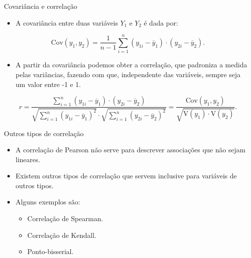 \documentclass[
  ignorenonframetext,
  serif,
  professionalfont,
  usenames,
  dvipsnames,
  aspectratio = 169]{beamer}
\providecommand{\tightlist}{%
  \setlength{\itemsep}{0pt}\setlength{\parskip}{0pt}}
\renewcommand{\tightlist}{%
  \setlength{\itemsep}{0\baselineskip}
  \setlength{\parskip}{0.25\baselineskip}
}
\def\beginAHalfColumn{\begin{minipage}{0.49\textwidth}}%
\def\endColumns{\end{minipage}}%
\begin{document}
\begin{frame}{Covariância e correlação}
\label{covariuxe2ncia-e-correlauxe7uxe3o}
\begin{itemize}
\tightlist
\item
  A covariância entre duas variáveis \(Y_1\) e \(Y_2\) é dada por:
\end{itemize}

\[
\textrm{Cov}(y_1, y_2) = \frac{1}{n - 1}
         \displaystyle\sum_{i = 1}^{n}
         (y_{1i} - \overline{y}_1)\cdot
         (y_{2i} - \overline{y}_2).
\]

\begin{itemize}
\tightlist
\item
  A partir da covariância podemos obter a correlação, que padroniza a
  medida pelas variâncias, fazendo com que, independente das variáveis,
  sempre seja um valor entre -1 e 1.
\end{itemize}

\[
    r = \frac{\sum_{i = 1}^{n}
      (y_{1i} - \overline{y}_1)\cdot (y_{2i} - \overline{y}_2)}{
      \sqrt{\sum_{i = 1}^{n} (y_{1i} - \overline{y}_1)^2}\cdot
      \sqrt{\sum_{i = 1}^{n} (y_{2i} - \overline{y}_2)^2}} =
      \frac{\textrm{Cov}(y_1, y_2)}{
        \sqrt{\textrm{V}(y_1)\cdot \textrm{V}(y_2)}}.
\]
\end{frame}

\begin{frame}{Outros tipos de correlação}
\label{outros-tipos-de-correlauxe7uxe3o}
\beginAHalfColumn

\begin{itemize}
\tightlist
\item
  A correlação de Pearson não serve para descrever associações que não
  sejam lineares.
\end{itemize}

\vspace{0.3cm}

\begin{itemize}
\tightlist
\item
  Existem outros tipos de correlação que servem inclusive para variáveis
  de outros tipos.
\end{itemize}

\endColumns
\beginAHalfColumn

\begin{itemize}
\tightlist
\item
  Alguns exemplos são:

  \begin{itemize}
  \tightlist
  \item
    Correlação de Spearman.
  \item
    Correlação de Kendall.
  \item
    Ponto-bisserial.
  \end{itemize}
\end{itemize}

\endColumns
\end{frame}
\end{document}
